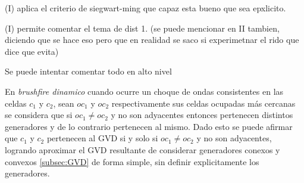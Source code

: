 (I) aplica el criterio de siegwart-ming que capaz esta bueno que sea epxlicito.

(I) permite comentar el tema de dist 1. (se puede mencionar en II tambien,
diciendo que se hace eso pero que en realidad se saco si experimetnar el rido
que dice que evita)

Se puede intentar comentar todo en alto nivel




En \emph{brushfire dinamico} cuando ocurre un choque de ondas consistentes en
las celdas $c_1$ y $c_2$, sean $oc_1$ y $oc_2$ respectivamente sus celdas
ocupadas más cercanas se considera que si $oc_1\neq oc_2$ y no son adyacentes
entonces pertenecen distintos generadores y de lo contrario pertenecen al
mismo. Dado esto se puede afirmar que $c_1$ y $c_2$ pertenecen al GVD si y solo
si $oc_1\neq oc_2$ y no son adyacentes, logrando aproximar el GVD resultante de considerar
generadores conexos y convexos \ref{subsec:GVD} de forma simple, sin definir explicitamente los generadores.






